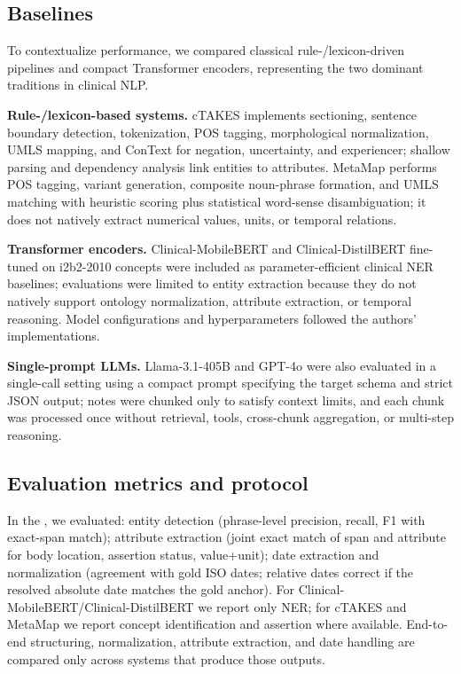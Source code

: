 \subsection{Baselines}

To contextualize performance, we compared classical rule-/lexicon-driven pipelines and compact Transformer encoders, representing the two dominant traditions in clinical NLP.

\textbf{Rule-/lexicon-based systems.} cTAKES \cite{Savova_2010} implements sectioning, sentence boundary detection, tokenization, POS tagging, morphological normalization, UMLS mapping, and ConText for negation, uncertainty, and experiencer; shallow parsing and dependency analysis link entities to attributes. MetaMap \cite{Aronson2001MetaMap} performs POS tagging, variant generation, composite noun-phrase formation, and UMLS matching with heuristic scoring plus statistical word-sense disambiguation; it does not natively extract numerical values, units, or temporal relations.

\textbf{Transformer encoders.} Clinical-MobileBERT and Clinical-DistilBERT \cite{Rohanian_2023,Rohanian_2024} fine-tuned on i2b2-2010 concepts  were included as parameter-efficient clinical NER baselines; evaluations were limited to entity extraction because they do not natively support ontology normalization, attribute extraction, or temporal reasoning. Model configurations and hyperparameters followed the authors' implementations.

\textbf{Single-prompt LLMs.} Llama-3.1-405B and GPT-4o were also evaluated in a single-call setting using a compact prompt specifying the target schema and strict JSON output; notes were chunked only to satisfy context limits, and each chunk was processed once without retrieval, tools, cross-chunk aggregation, or multi-step reasoning.

\subsection{Evaluation metrics and protocol}

In the , we evaluated: entity detection (phrase-level precision, recall, F1 with exact-span match); attribute extraction (joint exact match of span and attribute for body location, assertion status, value+unit); date extraction and normalization (agreement with gold ISO dates; relative dates correct if the resolved absolute date matches the gold anchor). For Clinical-MobileBERT/Clinical-DistilBERT we report only NER; for cTAKES and MetaMap we report concept identification and assertion where available. End-to-end structuring, normalization, attribute extraction, and date handling are compared only across systems that produce those outputs. 

